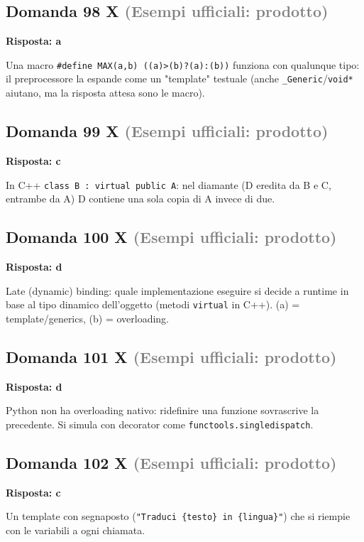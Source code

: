 \documentclass[a4paper,11pt]{article}
\begin{document}
\subsection*{Domanda 98 X \hfill {\small \textcolor{gray}{(Esempi ufficiali: prodotto)}}}
\textbf{Risposta: a}\par
Una macro \texttt{\#define MAX(a,b) ((a)\textgreater{}(b)?(a):(b))} funziona con qualunque tipo: il preprocessore la espande come un "template" testuale (anche \texttt{\_Generic}/\texttt{void*} aiutano, ma la risposta attesa sono le macro).



\subsection*{Domanda 99 X \hfill {\small \textcolor{gray}{(Esempi ufficiali: prodotto)}}}
\textbf{Risposta: c}\par
In C++ \texttt{class B : virtual public A}: nel diamante (D eredita da B e C, entrambe da A) D contiene una sola copia di A invece di due.



\subsection*{Domanda 100 X \hfill {\small \textcolor{gray}{(Esempi ufficiali: prodotto)}}}
\textbf{Risposta: d}\par
Late (dynamic) binding: quale implementazione eseguire si decide a runtime in base al tipo dinamico dell'oggetto (metodi \texttt{virtual} in C++). (a) = template/generics, (b) = overloading.



\subsection*{Domanda 101 X \hfill {\small \textcolor{gray}{(Esempi ufficiali: prodotto)}}}
\textbf{Risposta: d}\par
Python non ha overloading nativo: ridefinire una funzione sovrascrive la precedente. Si simula con decorator come \texttt{functools.singledispatch}.



\subsection*{Domanda 102 X \hfill {\small \textcolor{gray}{(Esempi ufficiali: prodotto)}}}
\textbf{Risposta: c}\par
Un template con segnaposto (\texttt{"Traduci \{testo\} in \{lingua\}"}) che si riempie con le variabili a ogni chiamata.
\end{document}
